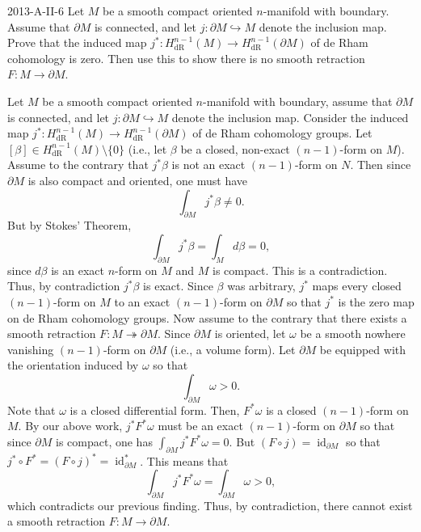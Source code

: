 \documentclass{article}
\newcommand{\embedd}{\hookrightarrow}
\begin{document}
	\begin{prb}{2013-A-II-6}
		Let $M$ be a smooth compact oriented $n$-manifold with boundary. Assume that $\partial M$ is connected, and let $j: \partial M \embedd M$ denote the inclusion map. Prove that the induced map $j^{\ast}: H^{n-1}_{\text{dR}}(M)\to H^{n-1}_{\text{dR}}(\partial M)$ of de Rham cohomology is zero. Then use this to show there is no smooth retraction $F: M \to \partial M$. 
	\end{prb}
	Let $M$ be a smooth compact oriented $n$-manifold with boundary, assume that $\partial M$ is connected, and let $j: \partial M \embedd M$ denote the inclusion map. Consider the induced map $j^{\ast}: H^{n-1}_{\text{dR}}(M) \to H^{n-1}_{\text{dR}}(\partial M)$ of de Rham cohomology groups. Let $[\beta] \in H^{n-1}_{\text{dR}}(M) \setminus \{0\}$ (i.e., let $\beta$ be a closed, non-exact $(n-1)$-form on $M$). Assume to the contrary that $j^{\ast}\beta$ is not an exact $(n-1)$-form on $N$. Then since $\partial M$ is also compact and oriented, one must have 
	\begin{equation*}
		\int_{\partial M}j^{\ast}\beta \neq 0. 
	\end{equation*}
	But by Stokes' Theorem, 
	\begin{equation*}
		\int_{\partial M}j^{\ast}\beta = \int_{M}d\beta = 0, 
	\end{equation*}
	since $d\beta$ is an exact $n$-form on $M$ and $M$ is compact. This is a contradiction. Thus, by contradiction $j^{\ast}\beta$ is exact. Since $\beta$ was arbitrary, $j^{\ast}$ maps every closed $(n-1)$-form on $M$ to an exact $(n-1)$-form on $\partial M$ so that $j^{\ast}$ is the zero map on de Rham cohomology groups. Now assume to the contrary that there exists a smooth retraction $F: M \twoheadrightarrow \partial M$. Since $\partial M$ is oriented, let $\omega$ be a smooth nowhere vanishing $(n-1)$-form on $\partial M$ (i.e., a volume form). Let $\partial M$ be equipped with the orientation induced by $\omega$ so that 
	\begin{equation*}
		\int_{\partial M}\omega > 0. 
	\end{equation*}
	Note that $\omega$ is a closed differential form. Then, $F^{\ast}\omega$ is a closed $(n-1)$-form on $M$. By our above work, $j^{\ast}F^{\ast}\omega$ must be an exact $(n-1)$-form on $\partial M$ so that since $\partial M$ is compact, one has $\int_{\partial M}j^{\ast}F^{\ast}\omega = 0$. But $(F \circ j) = \operatorname{id}_{\partial M}$ so that $j^{\ast} \circ F^{\ast} = (F \circ j)^{\ast} = \operatorname{id}_{\partial M}^{\ast}$. This means that 
	\begin{equation*}
		\int_{\partial M}j^{\ast}F^{\ast}\omega = \int_{\partial M}\omega > 0, 
	\end{equation*}
	which contradicts our previous finding. Thus, by contradiction, there cannot exist a smooth retraction $F: M \to \partial M$. 
	
\end{document}
